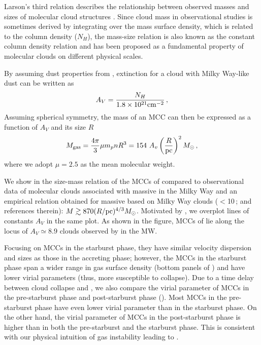 \IfFileExists{emulateapjlegacy.cls}{\documentclass[iop]{emulateapjlegacy}}{\documentclass[iop]{emulateapj}}
\begin{document}
Larson's third relation describes the relationship between observed masses and sizes of molecular cloud structures
\citep{Larson81a, McKee07a}.
Since cloud mass in observational studies is sometimes derived by integrating over the mass surface density,
which is related to the column density ($N_H$), %
the mass-size relation is also known as the constant column density relation and has been
proposed as a fundamental property of molecular clouds on different physical scales.

By assuming dust properties from \citet[][]{weingartner:2001}, extinction for a cloud with Milky Way-like dust can be written as
\begin{equation}
A_V = \frac{N_H}{1.8 \times 10^{21} {\rm cm}^{-2}}\,,
\end{equation}
Assuming spherical symmetry, the mass of an MCC can then be expressed as a function of $A_V$ and its size $R$
\begin{equation}\label{eqn:constantcolumndensity}
M_{\rm gas} = \frac{4\pi}{3} \mu m_p n R^3 = 154~A_v \left(\frac{R}{\rm pc}\right)^2 \Msun \,,
\end{equation}
where we adopt $\mu = 2.5$ as the mean molecular weight.

We show in  the size-mass relation of the MCCs of \flower compared to observational data of molecular clouds associated with massive \SF in the
Milky Way \citep{Beuther02a, Mueller02a, Hill05a, Motte07a} and an empirical relation obtained for massive \SF based on Milky Way clouds ($<$10\,\Msun; \citealt{Kauffmann10b, Kauffmann10c} and references therein): $M \gtrsim 870(R/{\rm pc})^{4/3} M_\odot$.
Motivated by \obs, we overplot lines of constants $A_V$ in the same plot.
As shown in the figure, MCCs of \flower lie along the locus of $A_V \simeq 8.9$ clouds observed by
\citet{Lombardi10a} in the MW.
%

Focusing on MCCs in the starburst phase, they have similar velocity dispersion and sizes
as those in the accreting phase; however, the MCCs in the starburst phase span
a wider range in gas surface density (bottom panels of ) and have lower virial parameters (thus, more susceptible to collapse).
Due to a time delay between cloud collapse and \SF, we also compare the virial parameter of MCCs in the pre-starburst phase and post-starburst phase
().
Most MCCs in the pre-starburst phase have even lower virial parameter than in the starburst phase. On the other hand,
the virial parameter of MCCs in the post-starburst phase is higher than in both the pre-starburst and the starburst phase.
This is consistent with our physical intuition of gas instability leading to \SF.
\end{document}
